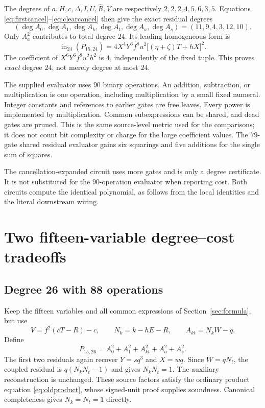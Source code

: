 \documentclass[11pt,a4paper]{article}
\theoremstyle{remark}
\newcommand{\Ptwo}{P_{15,24}}
\newcommand{\Pthree}{P_{15,26}}
\begin{document}
The degrees of $a,H,c,\Delta,I,U,\widehat R,V$ are respectively
$2,2,2,4,5,6,3,5$. Equations \eqref{eq:firstcancel}--\eqref{eq:clearcancel}
then give the exact residual degrees
\[
 (\deg A_0,\deg A_1,\deg A_k,\deg A_t,\deg A_a,\deg A_s)
       =(11,9,4,3,12,10).
\]
Only $A_a^2$ contributes to total degree $24$. Its leading homogeneous
form is
\begin{equation}
 \operatorname{in}_{24}(\Ptwo)
 =4X^4Y^6f^8u^2\bigl[(\eta+\zeta)T+hX\bigr]^2.
 \label{eq:leader24}
\end{equation}
The coefficient of $X^6Y^6f^8u^2h^2$ is $4$, independently of the fixed
tuple. This proves \emph{exact} degree $24$, not merely degree at most $24$.

The supplied evaluator uses $90$ binary operations. An addition,
subtraction, or multiplication is one operation, including multiplication
by a small fixed numeral. Integer constants and references to earlier
gates are free leaves. Every power is implemented by multiplication.
Common subexpressions can be shared, and dead gates are pruned. This is
the same source-level metric used for the comparisons; it does not count
bit complexity or charge for the large coefficient values. The $79$-gate
shared residual evaluator gains six squarings and five additions for the
single sum of squares.

The cancellation-expanded circuit uses more gates and is only a degree
certificate. It is not substituted for the $90$-operation evaluator when
reporting cost. Both circuits compute the identical polynomial, as follows
from the local identities and the literal downstream wiring.

\section{Two fifteen-variable degree--cost tradeoffs}
\label{sec:tradeoffs}

\subsection{Degree 26 with 88 operations}

Keep the fifteen variables and all common expressions of
Section~\ref{sec:formula}, but use
\[
 V=f^2(cT-R)-c,\qquad N_k=k-hE-R,
 \qquad A_{kt}=N_kW-q.
\]
Define
\begin{equation}
 \Pthree=A_0^2+A_1^2+A_{kt}^2+A_a^2+A_s^2.
 \label{eq:p26}
\end{equation}
The first two residuals again recover $Y=sq^3$ and $X=wq$. Since
$W=qN_t$, the coupled residual is $q(N_kN_t-1)$ and gives
$N_kN_t=1$. The auxiliary reconstruction is unchanged. These source
factors satisfy the ordinary product equation \eqref{eq:oldproduct},
whose signed-unit proof supplies soundness. Canonical completeness gives
$N_k=N_t=1$ directly.
\end{document}
